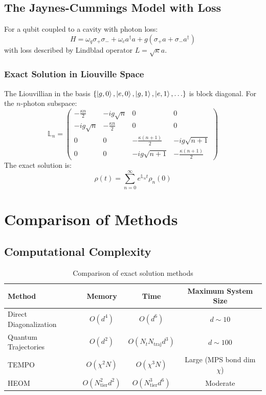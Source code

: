 \documentclass[12pt]{article}
\begin{document}
\subsection{The Jaynes-Cummings Model with Loss}

For a qubit coupled to a cavity with photon loss:
\[
H = \omega_q \sigma_+ \sigma_- + \omega_c a^\dagger a + g (\sigma_+ a + \sigma_- a^\dagger)
\]
with loss described by Lindblad operator $L = \sqrt{\kappa} a$.

\subsubsection{Exact Solution in Liouville Space}
The Liouvillian in the basis $\{\ket{g,0}, \ket{e,0}, \ket{g,1}, \ket{e,1}, \ldots\}$ is block diagonal. For the $n$-photon subspace:
\[
\mathbb{L}_n = \begin{pmatrix}
-\frac{\kappa n}{2} & -ig\sqrt{n} & 0 & 0 \\
-ig\sqrt{n} & -\frac{\kappa n}{2} & 0 & 0 \\
0 & 0 & -\frac{\kappa(n+1)}{2} & -ig\sqrt{n+1} \\
0 & 0 & -ig\sqrt{n+1} & -\frac{\kappa(n+1)}{2}
\end{pmatrix}
\]
The exact solution is:
\[
\rho(t) = \sum_{n=0}^\infty e^{\mathbb{L}_n t} \rho_n(0)
\]

\section{Comparison of Methods}

\subsection{Computational Complexity}

\begin{table}[h]
\centering
\begin{tabular}{|l|c|c|c|}
\hline
Method & Memory & Time & Maximum System Size \\
\hline
Direct Diagonalization & $O(d^4)$ & $O(d^6)$ & $d \sim 10$ \\
Quantum Trajectories & $O(d^2)$ & $O(N_t N_{\text{traj}} d^3)$ & $d \sim 100$ \\
TEMPO & $O(\chi^2 N)$ & $O(\chi^3 N)$ & Large (MPS bond dim $\chi$) \\
HEOM & $O(N_{\text{tier}}^2 d^2)$ & $O(N_{\text{tier}}^3 d^6)$ & Moderate \\
\hline
\end{tabular}
\caption{Comparison of exact solution methods}
\end{table}
\end{document}
